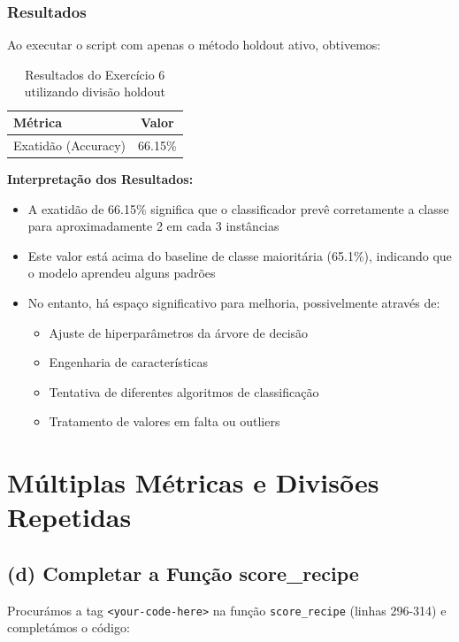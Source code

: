 \documentclass[12pt,a4paper]{article}
\begin{document}
\subsubsection{Resultados}

Ao executar o script com apenas o método holdout ativo, obtivemos:

\begin{table}[H]
\centering
\begin{tabular}{|l|c|}
\hline
\textbf{Métrica} & \textbf{Valor} \\
\hline
Exatidão (Accuracy) & 66.15\% \\
\hline
\end{tabular}
\caption{Resultados do Exercício 6 utilizando divisão holdout}
\end{table}

\textbf{Interpretação dos Resultados:}

\begin{itemize}
    \item A exatidão de 66.15\% significa que o classificador prevê corretamente a classe para aproximadamente 2 em cada 3 instâncias
    \item Este valor está acima do baseline de classe maioritária (65.1\%), indicando que o modelo aprendeu alguns padrões
    \item No entanto, há espaço significativo para melhoria, possivelmente através de:
    \begin{itemize}
        \item Ajuste de hiperparâmetros da árvore de decisão
        \item Engenharia de características
        \item Tentativa de diferentes algoritmos de classificação
        \item Tratamento de valores em falta ou outliers
    \end{itemize}
\end{itemize}

\section{Múltiplas Métricas e Divisões Repetidas}

\subsection{(d) Completar a Função score\_recipe}

Procurámos a tag \texttt{<your-code-here>} na função \texttt{score\_recipe} (linhas 296-314) e completámos o código:
\end{document}
